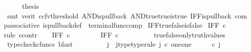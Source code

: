 \begin{isabellebody}
\ \ \isamarkupfalse%
\ \isamarkupfalse%
\ {\isacharquery}{\kern0pt}thesis\ \isanewline
\ \ \ \ \isamarkupfalse%
\ {\isacharparenleft}{\kern0pt}smt\ {\isacharparenleft}{\kern0pt}verit{\isacharcomma}{\kern0pt}\ ccfv{\isacharunderscore}{\kern0pt}threshold{\isacharparenright}{\kern0pt}\ AND{\isacharunderscore}{\kern0pt}is{\isacharunderscore}{\kern0pt}pullback\ AND{\isacharunderscore}{\kern0pt}true{\isacharunderscore}{\kern0pt}true{\isacharunderscore}{\kern0pt}is{\isacharunderscore}{\kern0pt}true\ IFF{\isacharunderscore}{\kern0pt}is{\isacharunderscore}{\kern0pt}pullback\ comp{\isacharunderscore}{\kern0pt}associative{}\ is{\isacharunderscore}{\kern0pt}pullback{\isacharunderscore}{\kern0pt}def\ \ terminal{\isacharunderscore}{\kern0pt}func{\isacharunderscore}{\kern0pt}comp{\isacharparenright}{\kern0pt}\isanewline
{}\isamarkupfalse%
%
\endisatagproof
{\isafoldproof}%
%
\isadelimproof
\isanewline
%
\endisadelimproof
\isanewline
{}\isamarkupfalse%
\ IFF{\isacharunderscore}{\kern0pt}true{\isacharunderscore}{\kern0pt}false{\isacharunderscore}{\kern0pt}is{\isacharunderscore}{\kern0pt}false{\isacharcolon}{\kern0pt}\isanewline
\ {\isachardoublequoteopen}IFF\ {\isasymcirc}\isactrlsub c\ {\isasymlangle}{\isasymt}{\isacharcomma}{\kern0pt}{\isasymf}{\isasymrangle}\ {\isacharequal}{\kern0pt}\ {\isasymf}{\isachardoublequoteclose}\isanewline
%
\isadelimproof
%
\endisadelimproof
%
\isatagproof
{}\isamarkupfalse%
{\isacharparenleft}{\kern0pt}rule\ ccontr{\isacharparenright}{\kern0pt}\isanewline
\ \ \isamarkupfalse%
\ {\isachardoublequoteopen}IFF\ {\isasymcirc}\isactrlsub c\ {\isasymlangle}{\isasymt}{\isacharcomma}{\kern0pt}{\isasymf}{\isasymrangle}\ {\isasymnoteq}\ {\isasymf}{\isachardoublequoteclose}\isanewline
\ \ \isamarkupfalse%
\ \isamarkupfalse%
\ {\isachardoublequoteopen}IFF\ {\isasymcirc}\isactrlsub c\ {\isasymlangle}{\isasymt}{\isacharcomma}{\kern0pt}{\isasymf}{\isasymrangle}\ \ {\isacharequal}{\kern0pt}\ {\isasymt}{\isachardoublequoteclose}\isanewline
\ \ \ \ \isamarkupfalse%
\ true{\isacharunderscore}{\kern0pt}false{\isacharunderscore}{\kern0pt}only{\isacharunderscore}{\kern0pt}truth{\isacharunderscore}{\kern0pt}values\ \isamarkupfalse%
\ {\isacharparenleft}{\kern0pt}typecheck{\isacharunderscore}{\kern0pt}cfuncs{\isacharcomma}{\kern0pt}\ blast{\isacharparenright}{\kern0pt}\ \ \ \ \isanewline
\ \ \isamarkupfalse%
\ \isamarkupfalse%
\ j\ \ j{\isacharunderscore}{\kern0pt}type{\isacharbrackleft}{\kern0pt}type{\isacharunderscore}{\kern0pt}rule{\isacharbrackright}{\kern0pt}{\isacharcolon}{\kern0pt}\ {\isachardoublequoteopen}j\ {\isasymin}\isactrlsub c\ one{\isasymCoprod}one\ {\isasymand}\ {\isacharparenleft}{\kern0pt}{\isasymlangle}{\isasymt}{\isacharcomma}{\kern0pt}\ {\isasymt}{\isasymrangle}\ {\isasymamalg}{\isasymlangle}{\isasymf}{\isacharcomma}{\kern0pt}\ {\isasymf}{\isasymrangle}{\isacharparenright}{\kern0pt}\ {\isasymcirc}\isactrlsub c\ j\ \ {\isacharequal}{\kern0pt}\ {\isasymlangle}{\isasymt}{\isacharcomma}{\kern0pt}{\isasymf}{\isasymrangle}{\isachardoublequoteclose}\isanewline

\end{isabellebody}
